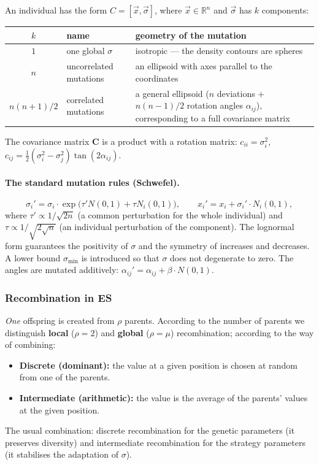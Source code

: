 \documentclass[11pt,a4paper]{article}
\theoremstyle{definition}
\begin{document}
An individual has the form $C = [\vec x, \vec \sigma]$, where
$\vec x \in \mathbb{R}^n$ and $\vec\sigma$ has $k$ components:

\begin{center}
\begin{tabular}{@{}clp{8.2cm}@{}}
\toprule
$k$ & name & geometry of the mutation \\
\midrule
$1$ & one global $\sigma$ & isotropic --- the density contours are spheres \\
$n$ & uncorrelated mutations & an ellipsoid with axes parallel to the
  coordinates \\
$n(n+1)/2$ & correlated mutations & a general ellipsoid ($n$ deviations $+$
  $n(n-1)/2$ rotation angles $\alpha_{ij}$), corresponding to a full covariance
  matrix \\
\bottomrule
\end{tabular}
\end{center}

The covariance matrix $\mathbf{C}$ is a product with a rotation matrix:
$c_{ii} = \sigma_i^2$,
$c_{ij} = \tfrac12(\sigma_i^2 - \sigma_j^2)\tan(2\alpha_{ij})$.

\paragraph{The standard mutation rules (Schwefel).}
\[
\sigma_i' = \sigma_i \cdot \exp\big(\tau' N(0,1) + \tau N_i(0,1)\big),
\qquad
x_i' = x_i + \sigma_i' \cdot N_i(0,1),
\]
where $\tau' \propto 1/\sqrt{2n}$ (a common perturbation for the whole
individual) and $\tau \propto 1/\sqrt{2\sqrt{n}}$ (an individual perturbation of
the component). The lognormal form guarantees the positivity of $\sigma$ and the
symmetry of increases and decreases. A lower bound $\sigma_{\min}$ is introduced
so that $\sigma$ does not degenerate to zero. The angles are mutated additively:
$\alpha_{ij}' = \alpha_{ij} + \beta \cdot N(0,1)$.

\subsubsection{Recombination in ES}

\emph{One} offspring is created from $\rho$ parents. According to the number of
parents we distinguish \textbf{local} ($\rho = 2$) and \textbf{global}
($\rho = \mu$) recombination; according to the way of combining:
\begin{itemize}
\item \textbf{Discrete (dominant):} the value at a given position is chosen at
  random from one of the parents.
\item \textbf{Intermediate (arithmetic):} the value is the average of the
  parents' values at the given position.
\end{itemize}
The usual combination: discrete recombination for the genetic parameters (it
preserves diversity) and intermediate recombination for the strategy parameters
(it stabilises the adaptation of $\sigma$).
\end{document}
